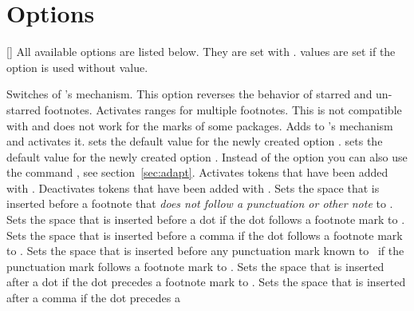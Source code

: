 \documentclass{fnpct-manual}
\begin{document}
\section{Options}\label{sec:options}
\begin{commands}
  []
    All available options are listed below. They are set with .
     values are set if the option is used without value.
\end{commands}
\begin{options}
    Switches of \fnpct's mechanism.
    This option reverses the behavior of starred and un-starred footnotes.
    Activates ranges for multiple footnotes.  This is not compatible with
     and does not work for the marks of some packages.
    Adds  to \fnpct's mechanism and activates it. 
    sets the default value for the newly created option
    .  sets the default value for
    the newly created option .
    Instead of the option you can also use the command ,
    see section~\ref{sec:adapt}.
    Activates tokens that have been added with .
    Deactivates tokens that have been added with .
  \Default{.06em}
    Sets the space that is inserted before a footnote that \emph{does not
      follow a punctuation or other note} to .
  \Default{-.16em}
    Sets the space that is inserted before a dot if the dot follows a footnote
    mark to .
  \Default{-.16em}
    Sets the space that is inserted before a comma if the dot follows a footnote
    mark to .
    Sets the space that is inserted before any punctuation mark known to
    \fnpct\ if the punctuation mark follows a footnote mark to
    .
  \Default{-.06em}
    Sets the space that is inserted after a dot if the dot precedes a footnote
    mark to .
  \Default{-.06em}
    Sets the space that is inserted after a comma if the dot precedes a

\end{options}
\end{document}
